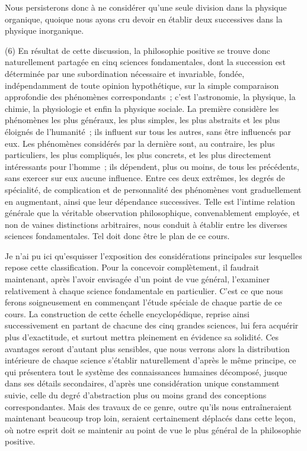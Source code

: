 \documentclass[french,twoside]{book} %
\begin{document}
Nous persisterons donc à ne considérer qu’une seule division dans la physique organique, quoique nous ayons cru devoir en établir deux successives dans la physique inorganique.\par
(6) En résultat de cette discussion, la philosophie positive se trouve donc naturellement partagée en cinq sciences fondamentales, dont la succession est déterminée par une subordination nécessaire et invariable, fondée, indépendamment de toute opinion hypothétique, sur la simple comparaison approfondie des phénomènes correspondants ; c’est l’astronomie, la physique, la chimie, la physiologie et enfin la physique sociale. La première considère les phénomènes les plus généraux, les plus simples, les plus abstraits et les plus éloignés de l’humanité ; ils influent sur tous les autres, sans être influencés par eux. Les phénomènes considérés par la dernière sont, au contraire, les plus particuliers, les plus compliqués, les plus concrets, et les plus directement intéressants pour l’homme ; ils dépendent, plus ou moins, de tous les précédents, sans exercer sur eux aucune influence. Entre ces deux extrêmes, les degrés de spécialité, de complication et de personnalité des phénomènes vont graduellement en augmentant, ainsi que leur dépendance successives. Telle est l’intime relation générale que la véritable observation philosophique, convenablement employée, et non de vaines distinctions arbitraires, nous conduit à établir entre les diverses sciences fondamentales. Tel doit donc être le plan de ce cours.\par
Je n’ai pu ici qu’esquisser l’exposition des considérations principales sur lesquelles repose cette classification. Pour la concevoir complètement, il faudrait maintenant, après l’avoir envisagée d’un point de vue général, l’examiner relativement à chaque science fondamentale en particulier. C’est ce que nous ferons soigneusement en commençant l’étude spéciale de chaque partie de ce cours. La construction de cette échelle encyclopédique, reprise ainsi successivement en partant de chacune des cinq grandes sciences, lui fera acquérir plus d’exactitude, et surtout mettra pleinement en évidence sa solidité. Ces avantages seront d’autant plus sensibles, que nous verrons alors la distribution intérieure de chaque science s’établir naturellement d’après le même principe, ce qui présentera tout le système des connaissances humaines décomposé, jusque dans ses détails secondaires, d’après une considération unique constamment suivie, celle du degré d’abstraction plus ou moins grand des conceptions correspondantes. Mais des travaux de ce genre, outre qu’ils nous entraîneraient maintenant beaucoup trop loin, seraient certainement déplacés dans cette leçon, où notre esprit doit se maintenir au point de vue le plus général de la philosophie positive.
\end{document}
